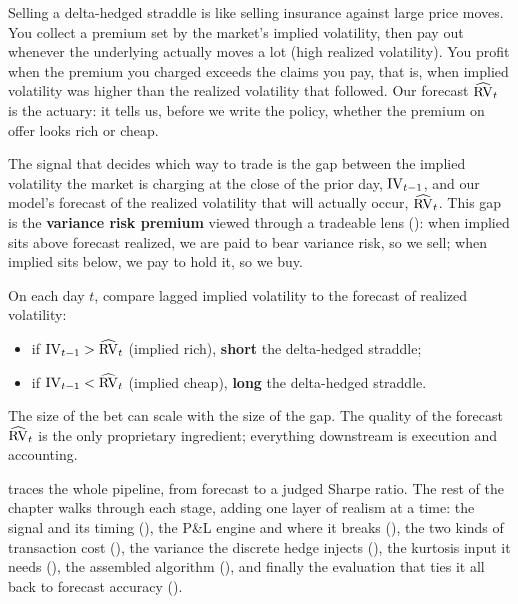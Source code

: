 \begin{intuition}
Selling a delta-hedged straddle is like selling insurance against large price moves. You collect a premium set by the market's implied volatility, then pay out whenever the underlying actually moves a lot (high realized volatility). You profit when the premium you charged exceeds the claims you pay, that is, when implied volatility was higher than the realized volatility that followed. Our forecast $\widehat{\operatorname{RV}}_t$ is the actuary: it tells us, before we write the policy, whether the premium on offer looks rich or cheap.
\end{intuition}

The signal that decides which way to trade is the gap between the implied volatility the market is charging at the close of the prior day, $\operatorname{IV}_{t-1}$, and our model's forecast of the realized volatility that will actually occur, $\widehat{\operatorname{RV}}_t$. This gap is the \textbf{variance risk premium} viewed through a tradeable lens (): when implied sits above forecast realized, we are paid to bear variance risk, so we sell; when implied sits below, we pay to hold it, so we buy.

\begin{keyidea}
On each day $t$, compare lagged implied volatility to the forecast of realized volatility:
\begin{itemize}
  \item if $\operatorname{IV}_{t-1} > \widehat{\operatorname{RV}}_t$ (implied rich), \textbf{short} the delta-hedged straddle;
  \item if $\operatorname{IV}_{t-1} < \widehat{\operatorname{RV}}_t$ (implied cheap), \textbf{long} the delta-hedged straddle.
\end{itemize}
The size of the bet can scale with the size of the gap. The quality of the forecast $\widehat{\operatorname{RV}}_t$ is the only proprietary ingredient; everything downstream is execution and accounting.
\end{keyidea}

 traces the whole pipeline, from forecast to a judged Sharpe ratio. The rest of the chapter walks through each stage, adding one layer of realism at a time: the signal and its timing (), the P\&L engine and where it breaks (), the two kinds of transaction cost (), the variance the discrete hedge injects (), the kurtosis input it needs (), the assembled algorithm (), and finally the evaluation that ties it all back to forecast accuracy ().

